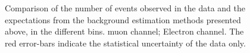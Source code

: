 \begin{figure}[htb]
\centering
{}\quad
{}\quad
\caption{
Comparison of the number of events observed in the data and the expectations from the background estimation methods presented above, in the different \STlep bins. muon channel;  Electron channel.
The red error-bars indicate the statistical uncertainty of the data only.}
\label{fig:susy_pred}
\end{figure}
